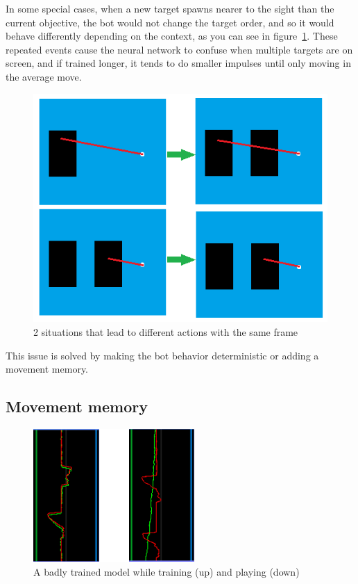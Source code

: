 In some special cases, when a new target spawns nearer to the sight than the current objective, the bot would not change the target order, and so it would behave differently depending on the context, as you can see in figure~\ref{fig:exDeterminism}. These repeated events cause the neural network to confuse when multiple targets are on screen, and if trained longer, it tends to do smaller impulses until only moving in the average move.

\begin{figure}[h]
  \centering
		\includegraphics[width=.9\textwidth]{img/exampleDet.png}
  \caption{2 situations that lead to different actions with the same frame}
  \label{fig:exDeterminism}
\end{figure}

This issue is solved by making the bot behavior deterministic or adding a movement memory.

\subsection{Movement memory}
\label{sec:movememory}

\begin{figure}[h]
  \centering
		\includegraphics[width=.5\textwidth]{img/graphsMemory.png}
  \caption{A badly trained model while training (up) and playing (down)}
  \label{fig:graphMem}
\end{figure}

